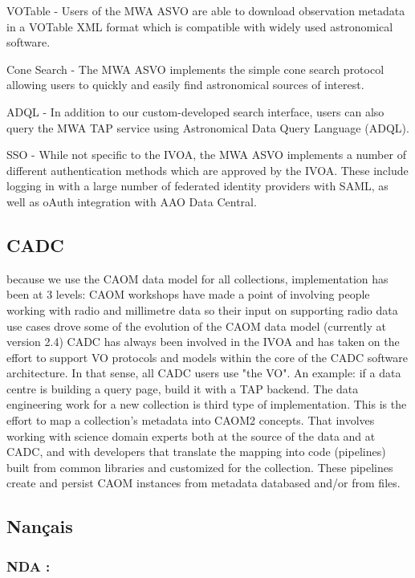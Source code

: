 \documentclass[11pt,a4paper]{ivoa}
\begin{document}
VOTable - Users of the MWA ASVO are able to download observation metadata in a VOTable XML format which is compatible with widely used astronomical software.

Cone Search - The MWA ASVO implements the simple cone search protocol allowing users to quickly and easily find astronomical sources of interest.

ADQL - In addition to our custom-developed search interface, users can also query the MWA TAP service using Astronomical Data Query Language (ADQL).

SSO - While not specific to the IVOA, the MWA ASVO implements a number of different authentication methods which are approved by the IVOA. These include logging in with a large number of federated identity providers with SAML, as well as oAuth integration with AAO Data Central.

\subsection{CADC}
\label{sec:CADC}
because we use the CAOM data model for all collections, implementation has been at 3 levels:
CAOM workshops have made a point of involving people working with radio and millimetre data so their input on supporting radio data use cases drove some of the evolution of the CAOM data model (currently at version 2.4)
CADC has always been involved in the IVOA and has taken on the effort to support VO protocols and models within the core of the CADC software architecture. In that sense, all CADC users use "the VO".  An example: if a data centre is building a query page, build it with a TAP backend.
The data engineering work for a new collection is third type of implementation. This is the effort to map a collection's metadata into CAOM2 concepts. That involves working with science domain experts both at the source of the data and at CADC, and with developers that translate the mapping into code (pipelines) built from common libraries and customized for the collection. These pipelines create and persist CAOM instances from metadata databased and/or from files.

\subsection{Nançais}
\label{sec:Nancay}

\subsubsection{NDA :}
\end{document}
